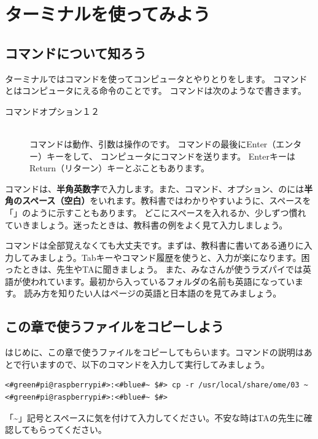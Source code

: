 \documentclass[text03.tex]{subfiles}
\begin{document}
\section{ターミナルを使ってみよう}
\subsection{コマンドについて知ろう}

ターミナルではコマンドを使ってコンピュータとやりとりをします。
コマンドとはコンピュータにえる命令のことです。
コマンドは次のようなで書きます。

\begin{description}
\item[コマンド\textvisiblespace オプション\textvisiblespace {}１\textvisiblespace{}２]\mbox{}\\
コマンドは動作、引数は操作のです。
 コマンドの最後にEnter（エンター）キーをして、
 コンピュータにコマンドを送ります。
 EnterキーはReturn（リターン）キーとぶこともあります。
\end{description}

コマンドは、{\bf 半角英数字}で入力します。また、コマンド、オプション、のには{\bf 半角のスペース（空白）}をいれます。教科書ではわかりやすいように、スペースを「\textvisiblespace 」のように示すこともあります。
どこにスペースを入れるか、少しずつ慣れていきましょう。迷ったときは、教科書の例をよく見て入力しましょう。

コマンドは全部覚えなくても大丈夫です。まずは、教科書に書いてある通りに入力してみましょう。Tabキーやコマンド履歴を使うと、入力が楽になります。困ったときは、先生やTAに聞きましょう。
また、みなさんが使うラズパイでは英語が使われています。最初から入っているフォルダの名前も英語になっています。
読み方を知りたい人は\pageref{英語と日本語の対応表}ページの英語と日本語のを見てみましょう。

\subsection{この章で使うファイルをコピーしよう}
はじめに、この章で使うファイルをコピーしてもらいます。コマンドの説明はあとで行いますので、以下のコマンドを入力して実行してみましょう。
\begin{lstlisting}[caption=使うファイルのコピー,label=workfilecopy]
<#green#pi@raspberrypi#>:<#blue#~ $#> cp -r /usr/local/share/ome/03 ~
<#green#pi@raspberrypi#>:<#blue#~ $#>
\end{lstlisting}
「\textasciitilde 」記号とスペースに気を付けて入力してください。不安な時はTAの先生に確認してもらってください。
\end{document}
